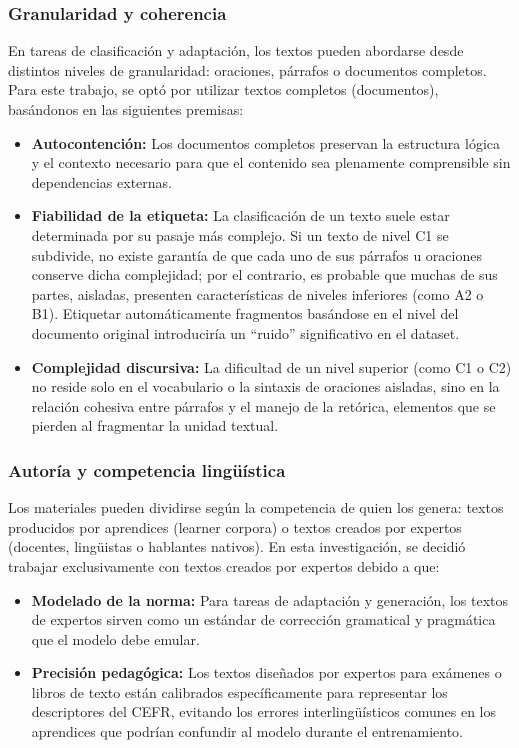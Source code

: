 \subsubsection*{Granularidad y coherencia}
En tareas de clasificación y adaptación, los textos pueden abordarse desde distintos niveles de granularidad: oraciones, párrafos o documentos completos. Para este trabajo, se optó por utilizar textos completos (documentos), basándonos en las siguientes premisas:
\begin{itemize}
    \item \textbf {Autocontención:} Los documentos completos preservan la estructura lógica y el contexto necesario para que el contenido sea plenamente comprensible sin dependencias externas.
    \item \textbf {Fiabilidad de la etiqueta:} La clasificación de un texto suele estar determinada por su pasaje más complejo. Si un texto de nivel C1 se subdivide, no existe garantía de que cada uno de sus párrafos u oraciones conserve dicha complejidad; por el contrario, es probable que muchas de sus partes, aisladas, presenten características de niveles inferiores (como A2 o B1). Etiquetar automáticamente fragmentos basándose en el nivel del documento original introduciría un ``ruido'' significativo en el dataset.

    \item \textbf {Complejidad discursiva:} La dificultad de un nivel superior (como C1 o C2) no reside solo en el vocabulario o la sintaxis de oraciones aisladas, sino en la relación cohesiva entre párrafos y el manejo de la retórica, elementos que se pierden al fragmentar la unidad textual.
\end{itemize}

\subsubsection*{Autoría y competencia lingüística}
Los materiales pueden dividirse según la competencia de quien los genera: textos producidos por aprendices (learner corpora) o textos creados por expertos (docentes, lingüistas o hablantes nativos). En esta investigación, se decidió trabajar exclusivamente con textos creados por expertos debido a que:

\begin{itemize}
    \item \textbf {Modelado de la norma:} Para tareas de adaptación y generación, los textos de expertos sirven como un estándar de corrección gramatical y pragmática que el modelo debe emular.
    \item \textbf {Precisión pedagógica:} Los textos diseñados por expertos para exámenes o libros de texto están calibrados específicamente para representar los descriptores del CEFR, evitando los errores interlingüísticos comunes en los aprendices que podrían confundir al modelo durante el entrenamiento.
\end{itemize}

